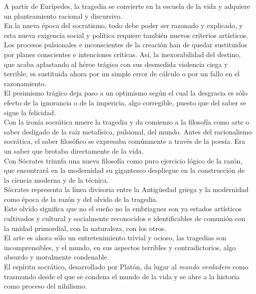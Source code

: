 \documentclass[a4paper, 10pt, twocolumn, spanish]{article}
\begin{document}
A partir de Eurípedes, la tragedia se convierte en la escuela de la
vida y adquiere un planteamiento racional y discursivo.\\[0pt]
En la nueva época del socratismo, todo debe poder ser razonado y
explicado, y esta nueva exigencia social y política requiere también
nuevos criterios artísticos.\\[0pt]

Los procesos pulsionales e inconscientes de la creación han de quedar
sustituidos por planes conscientes e intenciones críticas. Así, la
inexorabilidad del destino, que acaba aplastando al héroe trágico con
sus desmedida violencia ciega y terrible, es sustituida ahora por un
simple error de cálculo o por un fallo en el razonamiento.\\[0pt]
El pesimismo trágico deja paso a un optimismo según el cual la
desgracia es sólo efecto de la ignorancia o de la impericia, algo
corregible, puesto que del saber se sigue la felicidad.\\[0pt]


Con la ironía socrática muere la tragedia y da comienzo a la filosofía
como arte o saber desligado de la raíz metafísica, pulsional, del
mundo. Antes del racionalismo socrática, el saber filosófico se
expresaba comúnmente a través de la poesía. Era un saber que brotaba
directamente de la vida.\\[0pt]
Con Sócrates triunfa una nueva filosofía como puro ejercicio lógico de
la razón, que encontrará en la modernidad su gigantesco despliegue en
la construcción de la ciencia moderna y de la técnica.\\[0pt]
Sócrates representa la línea divisoria entre la Antigüedad griega y la
modernidad como época de la razón y del olvido de la tragedia.\\[0pt]

Este olvido significa que no el sueño no la embriaguez son ya estados
artísticos cultivados y cultural y socialmente reconocidos e
identificables de comunión con la unidad primordial, con la
naturaleza, con los otros.\\[0pt]

El arte es ahora sólo un entretenimiento trivial y ocioso, las
tragedias son incomprensibles, y el mundo, en sus aspectos terribles y
contradictorios, algo absurdo y moralmente condenable.\\[0pt]

El espíritu socrático, desarrollado por Platón, da lugar al \emph{mundo}
\emph{verdadero} como trasmundo desde el que se condena el mundo de la vida
y se abre a la historia como proceso del nihilismo.
\end{document}
